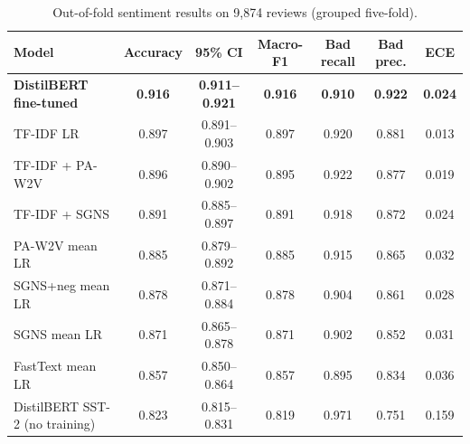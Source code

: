 \begin{table}[H]
\centering
\footnotesize
\caption{Out-of-fold sentiment results on 9,874 reviews (grouped five-fold).}
\label{tab:sent}
\begin{tabular}{lcccccc}
\toprule
Model & Accuracy & 95\% CI & Macro-F1 & Bad recall & Bad prec. & ECE \\
\midrule
\textbf{DistilBERT fine-tuned} & \textbf{0.916} & \textbf{0.911--0.921} & \textbf{0.916} & \textbf{0.910} & \textbf{0.922} & \textbf{0.024} \\
TF-IDF LR & 0.897 & 0.891--0.903 & 0.897 & 0.920 & 0.881 & 0.013 \\
TF-IDF + PA-W2V & 0.896 & 0.890--0.902 & 0.895 & 0.922 & 0.877 & 0.019 \\
TF-IDF + SGNS & 0.891 & 0.885--0.897 & 0.891 & 0.918 & 0.872 & 0.024 \\
PA-W2V mean LR & 0.885 & 0.879--0.892 & 0.885 & 0.915 & 0.865 & 0.032 \\
SGNS+neg mean LR & 0.878 & 0.871--0.884 & 0.878 & 0.904 & 0.861 & 0.028 \\
SGNS mean LR & 0.871 & 0.865--0.878 & 0.871 & 0.902 & 0.852 & 0.031 \\
FastText mean LR & 0.857 & 0.850--0.864 & 0.857 & 0.895 & 0.834 & 0.036 \\
DistilBERT SST-2 (no training) & 0.823 & 0.815--0.831 & 0.819 & 0.971 & 0.751 & 0.159 \\
\bottomrule
\end{tabular}
\end{table}